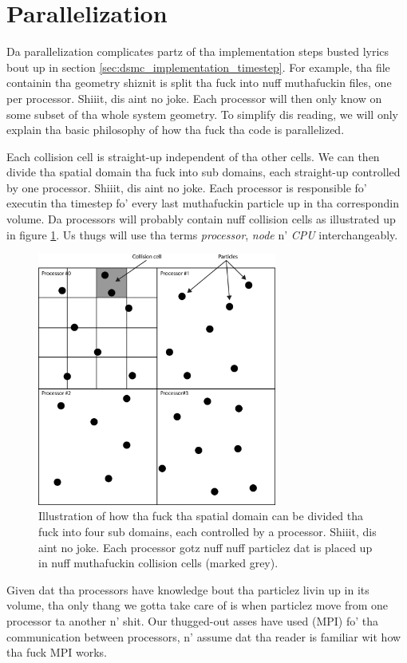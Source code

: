 \section{Parallelization}
\label{sec:dmsc_parallelization}
Da parallelization complicates partz of tha implementation steps busted lyrics bout up in section \ref{sec:dsmc_implementation_timestep}. For example, tha file containin tha geometry shiznit is split tha fuck into nuff muthafuckin files, one per processor. Shiiit, dis aint no joke. Each processor will then only know on some subset of tha whole system geometry. To simplify dis reading, we will only explain tha basic philosophy of how tha fuck tha code is parallelized.

Each collision cell is straight-up independent of tha other cells. We can then divide tha spatial domain tha fuck into sub domains, each straight-up controlled by one processor. Shiiit, dis aint no joke. Each processor is responsible fo' executin tha timestep fo' every last muthafuckin particle up in tha correspondin volume. Da processors will probably contain nuff collision cells as illustrated up in figure \ref{fig:dsmc_parallelization_1}. Us thugs will use tha terms \textit{processor}, \textit{node} n' \textit{CPU} interchangeably.
\begin{figure}[htb]
\begin{center}
\includegraphics[width=0.7\textwidth, trim=0cm 0cm 0cm 0cm, clip]{DSMC/figures/parallelization.eps}
\end{center}
\caption{Illustration of how tha fuck tha spatial domain can be divided tha fuck into four sub domains, each controlled by a processor. Shiiit, dis aint no joke. Each processor gotz nuff nuff particlez dat is placed up in nuff muthafuckin collision cells (marked grey).}
\label{fig:dsmc_parallelization_1}
\end{figure}
Given dat tha processors have knowledge bout tha particlez livin up in its volume, tha only thang we gotta take care of is when particlez move from one processor ta another n' shit. Our thugged-out asses have used (MPI) fo' tha communication between processors, n' assume dat tha reader is familiar wit how tha fuck MPI works. 

